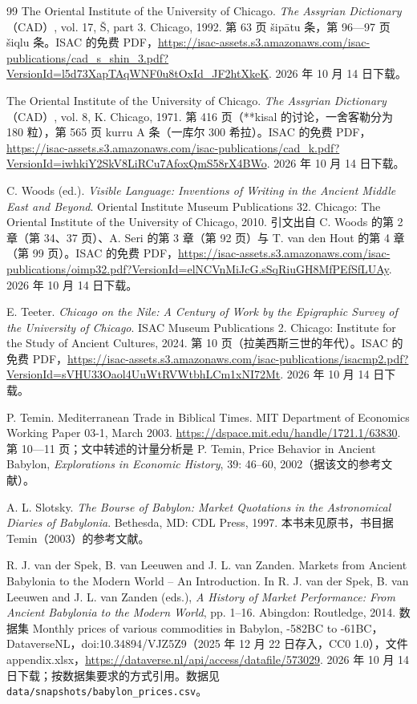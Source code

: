 \begin{thebibliography}{99}
 The Oriental Institute of the University of Chicago. \emph{The Assyrian Dictionary}（CAD）, vol. 17, Š, part 3. Chicago, 1992. 第 63 页 šipātu 条，第 96—97 页 šiqlu 条。ISAC 的免费 PDF，\url{https://isac-assets.s3.amazonaws.com/isac-publications/cad_s_shin_3.pdf?VersionId=l5d73XapTAqWNF0u8tOxId_JF2htXkeK}. 2026 年 10 月 14 日下载。

 The Oriental Institute of the University of Chicago. \emph{The Assyrian Dictionary}（CAD）, vol. 8, K. Chicago, 1971. 第 416 页（**kisal 的讨论，一舍客勒分为 180 粒），第 565 页 kurru A 条（一库尔 300 希拉）。ISAC 的免费 PDF，\url{https://isac-assets.s3.amazonaws.com/isac-publications/cad_k.pdf?VersionId=iwhkiY2SkV8LiRCu7AfoxQmS58rX4BWo}. 2026 年 10 月 14 日下载。

 C. Woods (ed.). \emph{Visible Language: Inventions of Writing in the Ancient Middle East and Beyond}. Oriental Institute Museum Publications 32. Chicago: The Oriental Institute of the University of Chicago, 2010. 引文出自 C. Woods 的第 2 章（第 34、37 页）、A. Seri 的第 3 章（第 92 页）与 T. van den Hout 的第 4 章（第 99 页）。ISAC 的免费 PDF，\url{https://isac-assets.s3.amazonaws.com/isac-publications/oimp32.pdf?VersionId=elNCVnMiJcG.sSqRiuGH8MfPEfSfLUAy}. 2026 年 10 月 14 日下载。

 E. Teeter. \emph{Chicago on the Nile: A Century of Work by the Epigraphic Survey of the University of Chicago}. ISAC Museum Publications 2. Chicago: Institute for the Study of Ancient Cultures, 2024. 第 10 页（拉美西斯三世的年代）。ISAC 的免费 PDF，\url{https://isac-assets.s3.amazonaws.com/isac-publications/isacmp2.pdf?VersionId=sVHU33Oaol4UuWtRVWtbhLCm1xNI72Mt}. 2026 年 10 月 14 日下载。

 P. Temin. Mediterranean Trade in Biblical Times. MIT Department of Economics Working Paper 03-1, March 2003. \url{https://dspace.mit.edu/handle/1721.1/63830}. 第 10—11 页；文中转述的计量分析是 P. Temin, Price Behavior in Ancient Babylon, \emph{Explorations in Economic History}, 39: 46--60, 2002（据该文的参考文献）。

 A. L. Slotsky. \emph{The Bourse of Babylon: Market Quotations in the Astronomical Diaries of Babylonia}. Bethesda, MD: CDL Press, 1997. 本书未见原书，书目据 Temin（2003）的参考文献。

 R. J. van der Spek, B. van Leeuwen and J. L. van Zanden. Markets from Ancient Babylonia to the Modern World -- An Introduction. In R. J. van der Spek, B. van Leeuwen and J. L. van Zanden (eds.), \emph{A History of Market Performance: From Ancient Babylonia to the Modern World}, pp. 1--16. Abingdon: Routledge, 2014. 数据集 Monthly prices of various commodities in Babylon, -582BC to -61BC，DataverseNL，doi:10.34894/VJZ5Z9（2025 年 12 月 22 日存入，CC0 1.0），文件 appendix.xlsx，\url{https://dataverse.nl/api/access/datafile/573029}. 2026 年 10 月 14 日下载；按数据集要求的方式引用。数据见 \texttt{data/snapshots/babylon\_prices.csv}。


\end{thebibliography}
